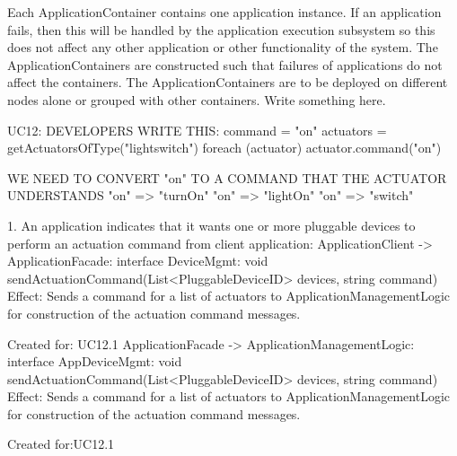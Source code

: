         Each ApplicationContainer contains one application instance. If an application fails,
        then this will be handled by the application execution subsystem so this
        does not affect any other application or other functionality of the system.
        The ApplicationContainers are constructed such that failures of applications
        do not affect the containers. The ApplicationContainers are to be deployed
        on different nodes alone or grouped with other containers. Write something here.




        UC12:
            DEVELOPERS WRITE THIS: command = "on"
            actuators = getActuatorsOfType("lightswitch")
            foreach (actuator) {
                actuator.command("on")
            }

            WE NEED TO CONVERT "on" TO A COMMAND THAT THE ACTUATOR UNDERSTANDS
            "on" => "turnOn"
            "on" => "lightOn"
            "on" => "switch"

            1. An application indicates that it wants one or more pluggable devices to perform an actuation command
                from client application:
                    ApplicationClient -> ApplicationFacade:           interface DeviceMgmt:       void sendActuationCommand(List<PluggableDeviceID> devices, string command)
                        Effect: Sends a command for a list of actuators to ApplicationManagementLogic for construction of the actuation command messages.
                        \item Created for: UC12.1
                    ApplicationFacade -> ApplicationManagementLogic:  interface AppDeviceMgmt:  void sendActuationCommand(List<PluggableDeviceID> devices, string command)
                        Effect: Sends a command for a list of actuators to ApplicationManagementLogic for construction of the actuation command messages.
                        \item Created for:UC12.1

